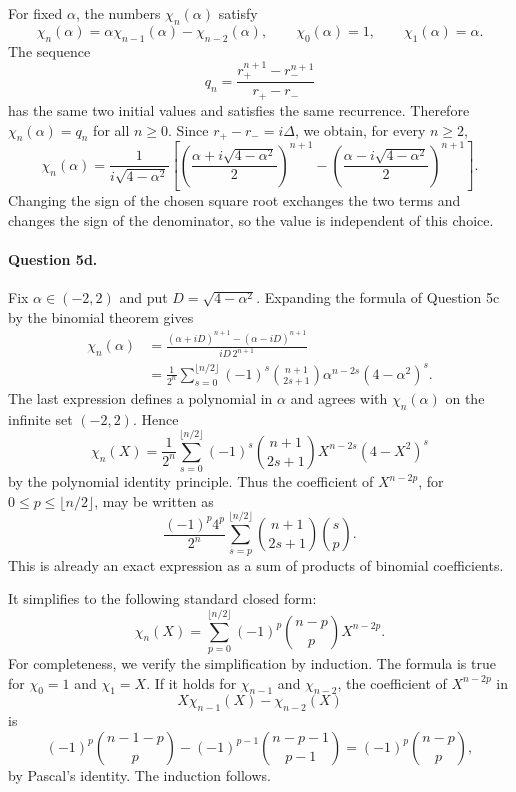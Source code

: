 \documentclass[11pt,a4paper]{article}
\begin{document}
For fixed $\alpha$, the numbers $\chi_n(\alpha)$ satisfy
\[
  \chi_n(\alpha)=\alpha\chi_{n-1}(\alpha)-\chi_{n-2}(\alpha),
  \qquad \chi_0(\alpha)=1,
  \qquad \chi_1(\alpha)=\alpha.
\]
The sequence
\[
  q_n=\frac{r_+^{n+1}-r_-^{n+1}}{r_+-r_-}
\]
has the same two initial values and satisfies the same recurrence.  Therefore $\chi_n(\alpha)=q_n$ for all $n\ge0$.  Since $r_+-r_-=i\Delta$, we obtain, for every $n\ge2$,
\[
  \boxed{
  \chi_n(\alpha)=\frac{1}{i\sqrt{4-\alpha^2}}
  \left[
  \left(\frac{\alpha+i\sqrt{4-\alpha^2}}2\right)^{n+1}
  -
  \left(\frac{\alpha-i\sqrt{4-\alpha^2}}2\right)^{n+1}
  \right].}
\]
Changing the sign of the chosen square root exchanges the two terms and changes the sign of the denominator, so the value is independent of this choice.

\paragraph{Question 5d.}
Fix $\alpha\in(-2,2)$ and put $D=\sqrt{4-\alpha^2}$.  Expanding the formula
of Question 5c by the binomial theorem gives
\[
\begin{aligned}
  \chi_n(\alpha)
  &=\frac{(\alpha+iD)^{n+1}-(\alpha-iD)^{n+1}}{iD\,2^{n+1}}\\
  &=\frac1{2^n}\sum_{s=0}^{\lfloor n/2\rfloor}
      (-1)^s\binom{n+1}{2s+1}\alpha^{n-2s}(4-\alpha^2)^s.
\end{aligned}
\]
The last expression defines a polynomial in $\alpha$ and agrees with
$\chi_n(\alpha)$ on the infinite set $(-2,2)$.  Hence
\[
  \chi_n(X)=\frac1{2^n}\sum_{s=0}^{\lfloor n/2\rfloor}
      (-1)^s\binom{n+1}{2s+1}X^{n-2s}(4-X^2)^s
\]
by the polynomial identity principle.
Thus the coefficient of $X^{n-2p}$, for $0\le p\le\lfloor n/2\rfloor$, may be written as
\[
  \frac{(-1)^p4^p}{2^n}
  \sum_{s=p}^{\lfloor n/2\rfloor}
  \binom{n+1}{2s+1}\binom{s}{p}.
\]
This is already an exact expression as a sum of products of binomial coefficients.

It simplifies to the following standard closed form:
\[
  \boxed{\chi_n(X)=\sum_{p=0}^{\lfloor n/2\rfloor}
  (-1)^p\binom{n-p}{p}X^{n-2p}.}
\]
For completeness, we verify the simplification by induction.  The formula is true for $\chi_0=1$ and $\chi_1=X$.  If it holds for $\chi_{n-1}$ and $\chi_{n-2}$, the coefficient of $X^{n-2p}$ in
\[
  X\chi_{n-1}(X)-\chi_{n-2}(X)
\]
is
\[
  (-1)^p\binom{n-1-p}{p}
  -(-1)^{p-1}\binom{n-p-1}{p-1}
  =(-1)^p\binom{n-p}{p},
\]
by Pascal's identity.  The induction follows.
\end{document}
